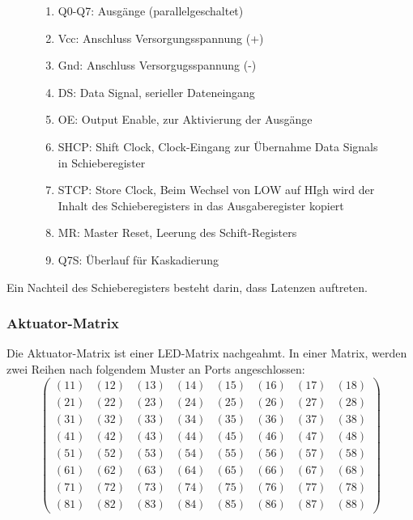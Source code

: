 \begin{figure}[htbp]
\begin{minipage}{0.4\textwidth}
\end{minipage}
\begin{minipage}{0.6\textwidth}
	\begin{enumerate}
		\item Q0-Q7: Ausgänge (parallelgeschaltet)
		\item Vcc: Anschluss Versorgungsspannung (+)
		\item Gnd: Anschluss Versorgugsspannung (-)
		\item DS: Data Signal, serieller Dateneingang
		\item OE: Output Enable, zur Aktivierung der Ausgänge
		\item SHCP: Shift Clock, Clock-Eingang zur Übernahme Data Signals in Schieberegister
		\item STCP: Store Clock, Beim Wechsel von LOW auf HIgh wird der Inhalt des Schieberegisters in das Ausgaberegister kopiert %
		\item MR: Master Reset, Leerung des Schift-Registers
		\item Q7S: Überlauf für Kaskadierung
	\end{enumerate}
\end{minipage}
\end{figure}
Ein Nachteil des Schieberegisters besteht darin, dass Latenzen auftreten.
\subsubsection{Aktuator-Matrix} %
Die Aktuator-Matrix ist einer LED-Matrix nachgeahmt.
In einer Matrix, werden zwei Reihen nach folgendem Muster an Ports angeschlossen:
$$
\begin{pmatrix}
	(11) & (12) & (13) & (14) & (15) & (16) & (17) & (18) \\
	(21) & (22) & (23) & (24) & (25) & (26) & (27) & (28) \\
	(31) & (32) & (33) & (34) & (35) & (36) & (37) & (38) \\
	(41) & (42) & (43) & (44) & (45) & (46) & (47) & (48) \\
	(51) & (52) & (53) & (54) & (55) & (56) & (57) & (58) \\
	(61) & (62) & (63) & (64) & (65) & (66) & (67) & (68) \\
	(71) & (72) & (73) & (74) & (75) & (76) & (77) & (78) \\
	(81) & (82) & (83) & (84) & (85) & (86) & (87) & (88)
\end{pmatrix}
$$

